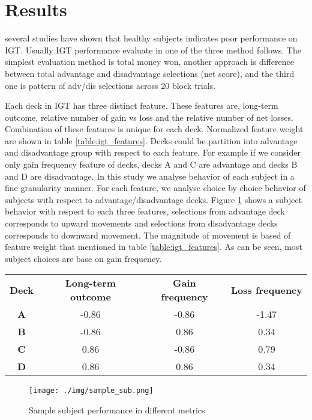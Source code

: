 \section{Results}
several studies have shown that healthy subjects indicates
poor performance on IGT. Usually IGT performance evaluate in
one of the three method follows. The simplest evaluation
method is total money won, another approach is difference
between total advantage and disadvantage selections (net
score), and the third one is pattern of adv/dis selections
across 20 block
trials.


Each deck in IGT has three distinct feature. These features
are, long-term outcome, relative number of gain vs loss and
the relative number of net losses. Combination of these
features is unique for each deck.
Normalized feature weight are shown in table \ref{table:igt_features}.
Decks could be partition into advantage and disadvantage
group with respect to each feature. For example if we
consider only gain frequency feature of decks, decks A and C
are advantage and decks B and D are disadvantage. In this
study we analyse behavior of each subject in a fine
granularity manner. For each feature, we analyse choice by
choice behavior of subjects with respect to advantage/disadvantage decks.
Figure \ref{fig:sample_sub} shows a subject behavior with respect to each three
features, selections from advantage deck corresponds to
upward movements and selections from disadvantage
decks corresponds to downward movement. The magnitude of
movement is based of feature weight that mentioned in table \ref{table:igt_features}. 
As can be seen, most subject choices are base on gain
frequency. 

\begin{table*}
\caption{Normalized weight of features in IGT}
\label{table:igt_features}
\centering
\begin{tabular}{cccc}
\textbf{Deck} & \textbf{Long-term outcome} & \textbf{Gain frequency} & \textbf{Loss frequency} \\ 
\textbf{A} & -0.86  & -0.86 & -1.47 \\ 
\textbf{B} & -0.86  &  0.86 &  0.34 \\ 
\textbf{C} &  0.86  & -0.86 &  0.79 \\ 
\textbf{D} &  0.86  &  0.86 &  0.34 \\ 
\end{tabular} 
\end{table*}


\begin{figure}
\caption{Sample subject performance in different metrics}
\label{fig:sample_sub}
\centering
\texttt{[image: ./img/sample\_sub.png]}
\end{figure}

